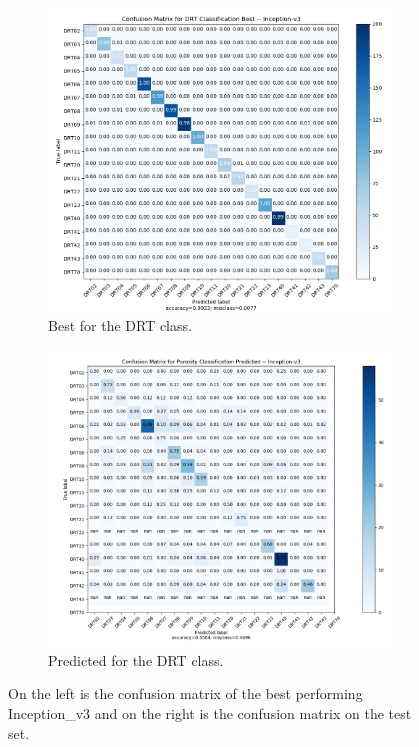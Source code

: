 \begin{figure}
{\begin{subfigure}[b]{.6\textwidth}
\centering
\includegraphics[width=.95\textwidth]{figures/04-go_drt_best.PNG}
\caption{Best for the DRT class.}
\label{fig:gocm_drt}
\end{subfigure}%
\begin{subfigure}[b]{.6\textwidth}
\centering
\includegraphics[width=.95\textwidth]{figures/04-go_drt_pred.PNG}
\caption{Predicted for the DRT class.}
\label{fig:gocm_drt_pred}
\end{subfigure}%
}
\caption[Confusion matrices of classes trained on Inception\_v3]{On the left is the confusion matrix of the best performing Inception\_v3 and on the right is the confusion matrix on the test set.}
\label{fig:gocm}
\end{figure}

